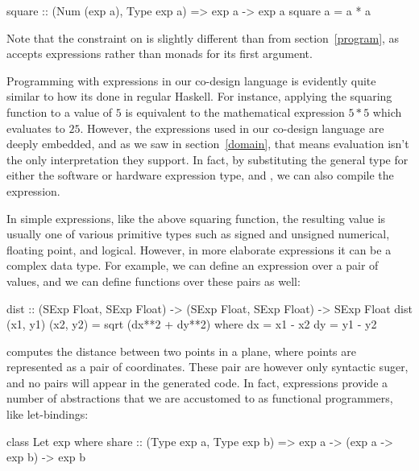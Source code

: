 \documentclass[../main.tex]{subfiles}
\begin{document}
\begin{code}
square :: (Num (exp a), Type exp a) => exp a -> exp a
square a = a * a
\end{code}

\noindent Note that the  constraint on  is slightly different than  from section~\ref{program}, as  accepts expressions rather than monads for its first argument.


Programming with expressions in our co-design language is evidently quite similar to how its done in regular Haskell. For instance, applying the squaring function to a value of $5$ is equivalent to the mathematical expression $5*5$ which evaluates to $25$. However, the expressions used in our co-design language are deeply embedded, and as we saw in section~\ref{domain}, that means evaluation isn't the only interpretation they support. In fact, by substituting the general  type for either the software or hardware expression type,  and , we can also compile the expression.

In simple expressions, like the above squaring function, the resulting value is usually one of various primitive types such as signed and unsigned numerical, floating point, and logical. However, in more elaborate expressions it can be a complex data type. For example, we can define an expression over a pair of values, and we can define functions over these pairs as well:

\begin{code}
dist :: (SExp Float, SExp Float) -> (SExp Float, SExp Float) -> SExp Float
dist (x1, y1) (x2, y2) = sqrt (dx**2 + dy**2)
  where
    dx = x1 - x2
    dy = y1 - y2
\end{code}

 computes the distance between two points in a plane, where points are represented as a pair of coordinates. These pair are however only syntactic suger, and no pairs will appear in the generated code. In fact, expressions provide a number of abstractions that we are accustomed to as functional programmers, like let-bindings:

\begin{code}
class Let exp where
  share :: (Type exp a, Type exp b) => exp a -> (exp a -> exp b) -> exp b
\end{code}
\end{document}
